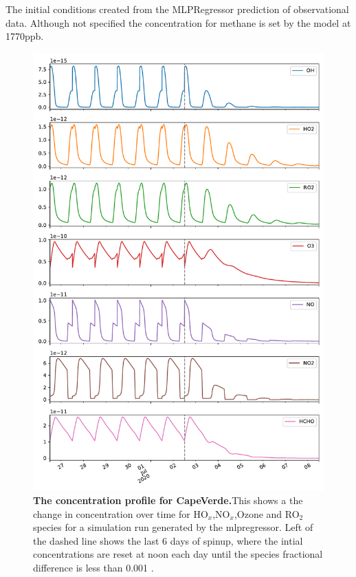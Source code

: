 \begin{table}[H]
\centering
\small

\caption{The initial conditions created from the MLPRegressor prediction of observational data. Although not specified the concentration for methane is set by the model at 1770ppb.}
\label{tab:icsmetric}
\end{table}

\newpage


\begin{figure}[H]
    \centering
\includegraphics[width=.9\textwidth]{figures_c3/mlpregressor/conc_cape.pdf}
\caption{\textbf{The concentration profile for CapeVerde.}This shows a the change in concentration over time for HO$_x$,NO$_x$,Ozone and RO$_2$ species for a simulation run generated by the mlpregressor. Left of the dashed line shows the last 6 days of spinup, where the intial concentrations are reset at noon each day until the species fractional difference is less than 0.001 .}
\label{fig:ccape}
\end{figure}

